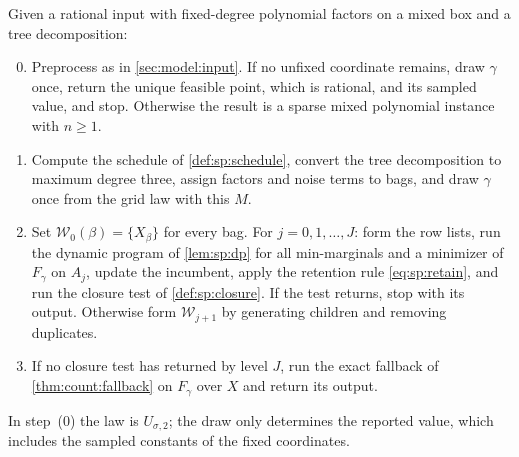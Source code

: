 \begin{definition}\label{def:sp:algorithm}
Given a rational input with fixed-degree polynomial factors on a mixed box
and a tree decomposition:
\begin{enumerate}[label=(\arabic*)]
\setcounter{enumi}{-1}
\item Preprocess as in \cref{sec:model:input}. If no unfixed coordinate
remains, draw $\gamma$ once, return the unique feasible point, which is
rational, and its sampled value, and stop. Otherwise the result is a sparse
mixed polynomial instance with $n\ge1$.
\item Compute the schedule of \cref{def:sp:schedule}, convert the tree
decomposition to maximum degree three, assign factors and noise terms to
bags, and draw $\gamma$ once from the grid law with this $M$.
\item Set $\mathcal W_0(\beta)=\{X_\beta\}$ for every bag. For
$j=0,1,\ldots,J$: form the row lists, run the dynamic program of
\cref{lem:sp:dp} for all min-marginals and a minimizer of $F_\gamma$ on
$A_j$, update the incumbent, apply the retention rule \eqref{eq:sp:retain},
and run the closure test of \cref{def:sp:closure}. If the test returns, stop
with its output. Otherwise form $\mathcal W_{j+1}$ by generating children and
removing duplicates.
\item If no closure test has returned by level $J$, run the exact fallback of
\cref{thm:count:fallback} on $F_\gamma$ over $X$ and return its output.
\end{enumerate}
In step~(0) the law is $U_{\sigma,2}$; the draw only determines the
reported value, which includes the sampled constants of the fixed
coordinates.
\end{definition}

